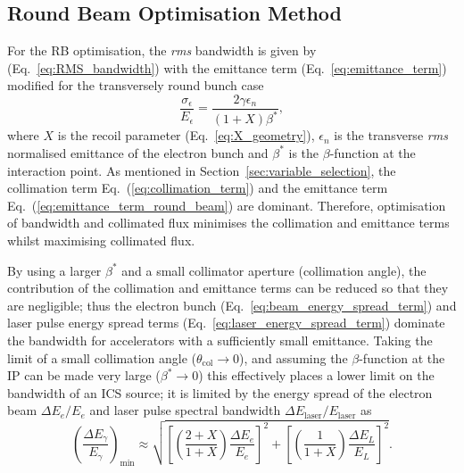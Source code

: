 \documentclass[../main.tex]{subfiles}
\begin{document}
\subsection{Round Beam Optimisation Method}

For the RB optimisation, the \textit{rms} bandwidth is given by (Eq.~\ref{eq:RMS_bandwidth}) with the emittance term (Eq.~\ref{eq:emittance_term}) modified for the transversely round bunch case
\begin{equation}
\frac{\sigma_{\epsilon}}{E_{\epsilon}} = \frac{2\gamma\epsilon_{n}}{\left(1+X\right)\beta^{*}},
\label{eq:emittance_term_round_beam}    
\end{equation}
where $X$ is the recoil parameter (Eq.~\ref{eq:X_geometry}), $\epsilon_{n}$ is the transverse \textit{rms} normalised emittance of the electron bunch and $\beta^{*}$ is the $\beta$-function at the interaction point. As mentioned in Section~\ref{sec:variable_selection}, the collimation term Eq.~(\ref{eq:collimation_term}) and the emittance term Eq.~(\ref{eq:emittance_term_round_beam}) are dominant. Therefore, optimisation of bandwidth and collimated flux minimises the collimation and emittance terms whilst maximising collimated flux.

By using a larger $\beta^{*}$ and a small collimator aperture (collimation angle), the contribution of the collimation and emittance terms can be reduced so that they are negligible; thus the electron bunch (Eq.~\ref{eq:beam_energy_spread_term}) and laser pulse energy spread terms (Eq.~\ref{eq:laser_energy_spread_term}) dominate the bandwidth for accelerators with a sufficiently small emittance. Taking the limit of a small collimation angle ($\theta_{\mathrm{col}}\rightarrow 0$), and assuming the $\beta$-function at the IP can be made very large ($\beta^{*}\rightarrow 0$) this effectively places a lower limit on the bandwidth of an ICS source; it is limited by the energy spread of the electron beam $\Delta E_{e}/E_{e}$ and laser pulse spectral bandwidth $\Delta E_{\mathrm{laser}}/E_{\mathrm{laser}}$ as 
\begin{equation}
\left(\frac{\Delta E_{\gamma}}{E_{\gamma}}\right)_{\mathrm{min}} \approx \sqrt{\left[\left(\frac{2+X}{1+X}\right)\frac{\Delta E_{e}}{E_{e}}\right]^{2} + \left[\left(\frac{1}{1+X}\right)\frac{\Delta E_{L}}{E_{L}}\right]^{2}}.
\label{eq:bandwidth_limitation_minimum}
\end{equation}
\end{document}
